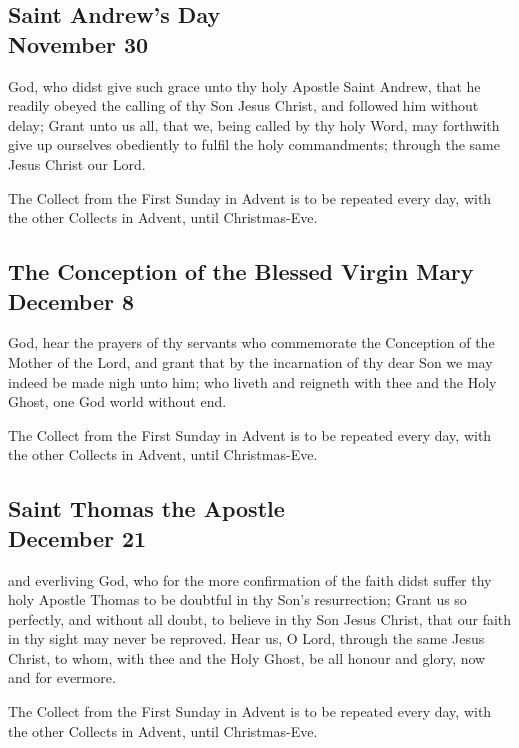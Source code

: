 \subsection{Saint Andrew's Day\\
November 30}
 God, who didst give such grace unto thy holy Apostle Saint Andrew, that he readily obeyed the calling of thy Son Jesus Christ, and followed him without delay; Grant unto us all, that we, being called by thy holy Word, may forthwith give up ourselves obediently to fulfil the holy commandments; through the same Jesus Christ our Lord.
\begin{secrubric}
The Collect from the First Sunday in Advent is to be repeated every day, with the other Collects in Advent, until Christmas-Eve.
\end{secrubric}

\subsection{The Conception of the Blessed Virgin Mary\\
December 8}
 God, hear the prayers of thy servants who commemorate the Conception of the Mother of the Lord, and grant that by the incarnation of thy dear Son we may indeed be made nigh unto him; who liveth and reigneth with thee and the Holy Ghost, one God world without end.
\begin{secrubric}
The Collect from the First Sunday in Advent is to be repeated every day, with the other Collects in Advent, until Christmas-Eve.
\end{secrubric}

\subsection{Saint Thomas the Apostle\\
December 21}
 and everliving God, who for the more confirmation of the faith didst suffer thy holy Apostle Thomas to be doubtful in thy Son's resurrection; Grant us so perfectly, and without all doubt, to believe in thy Son Jesus Christ, that our faith in thy sight may never be reproved. Hear us, O Lord, through the same Jesus Christ, to whom, with thee and the Holy Ghost, be all honour and glory, now and for evermore.
\begin{secrubric}
The Collect from the First Sunday in Advent is to be repeated every day, with the other Collects in Advent, until Christmas-Eve.
\end{secrubric}


